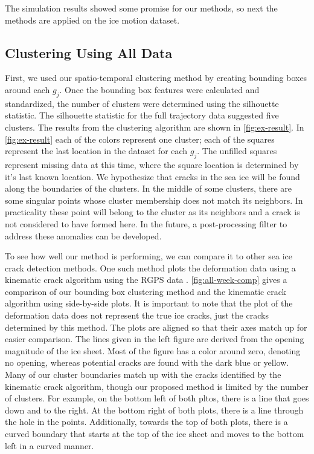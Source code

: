 \documentclass[12pt]{article}
\begin{document}
The simulation results showed some promise for our methods, so next the
methods are applied on the ice motion dataset.

\hypertarget{clustering-using-all-data}{%
\subsection{Clustering Using All Data}\label{clustering-using-all-data}}

First, we used our spatio-temporal clustering method by creating
bounding boxes around each \(g_j\). Once the bounding box features were
calculated and standardized, the number of clusters were determined
using the silhouette statistic. The silhouette statistic for the full
trajectory data suggested five clusters. The results from the clustering
algorithm are shown in \cref{fig:ex-result}. In \cref{fig:ex-result}
each of the colors represent one cluster; each of the squares represent
the last location in the dataset for each \(g_j\). The unfilled squares
represent missing data at this time, where the square location is
determined by it's last known location. We hypothesize that cracks in
the sea ice will be found along the boundaries of the clusters. In the
middle of some clusters, there are some singular points whose cluster
membership does not match its neighbors. In practicality these point
will belong to the cluster as its neighbors and a crack is not
considered to have formed here. In the future, a post-processing filter
to address these anomalies can be developed.

To see how well our method is performing, we can compare it to other sea
ice crack detection methods. One such method plots the deformation data
using a kinematic crack algorithm using the RGPS data
\citep{peterson_evaluating_2011}. \cref{fig:all-week-comp} gives a
comparison of our bounding box clustering method and the kinematic crack
algorithm using side-by-side plots. It is important to note that the
plot of the deformation data does not represent the true ice cracks,
just the cracks determined by this method. The plots are aligned so that
their axes match up for easier comparison. The lines given in the left
figure are derived from the opening magnitude of the ice sheet. Most of
the figure has a color around zero, denoting no opening, whereas
potential cracks are found with the dark blue or yellow. Many of our
cluster boundaries match up with the cracks identified by the kinematic
crack algorithm, though our proposed method is limited by the number of
clusters. For example, on the bottom left of both pltos, there is a line
that goes down and to the right. At the bottom right of both plots,
there is a line through the hole in the points. Additionally, towards
the top of both plots, there is a curved boundary that starts at the top
of the ice sheet and moves to the bottom left in a curved manner.
\end{document}
